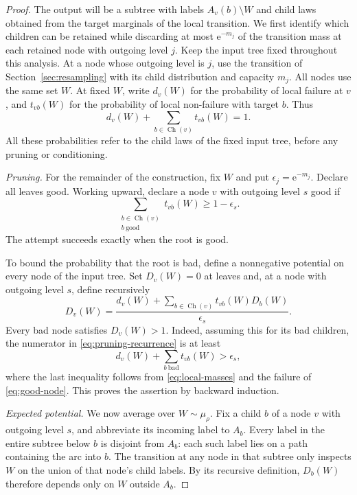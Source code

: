 \documentclass[11pt]{article}
\numberwithin{equation}{section}
\newcommand{\ch}{\operatorname{Ch}}
\newcommand{\ee}{\mathrm e}
\begin{document}
\begin{proof}
The output will be a subtree with labels $A_v(b)\setminus W$ and
child laws obtained from the target marginals of the local transition.
We first identify which children can be retained while discarding
at most $\ee^{-m_j}$ of the transition mass at each retained node
with outgoing level $j$.
Keep the input tree fixed throughout this analysis. At a node whose
outgoing level is $j$, use the transition of
Section~\ref{sec:resampling} with its child distribution and
capacity $m_j$. All nodes use the same set $W$. At fixed $W$, write
$d_v(W)$ for the probability of local failure at $v$, and
$t_{vb}(W)$ for the probability of local non-failure with target $b$.
Thus
\begin{equation}\label{eq:local-masses}
 d_v(W)+\sum_{b\in\ch(v)}t_{vb}(W)=1.
\end{equation}
All these probabilities refer to the child laws of the fixed input
tree, before any pruning or conditioning.

\medskip\noindent
\textit{Pruning.}
For the remainder of the construction, fix $W$ and put
$\epsilon_j=\ee^{-m_j}$. Declare all leaves good. Working upward,
declare a node $v$ with outgoing level $s$ good if
\begin{equation}\label{eq:good-node}
 \sum_{\substack{b\in\ch(v)\\b\ \mathrm{good}}}t_{vb}(W)
 \ge1-\epsilon_s.
\end{equation}
The attempt succeeds exactly when the root is good.

To bound the probability that the root is bad, define a nonnegative
potential on every node of the input tree. Set $D_v(W)=0$ at leaves
and, at a node with outgoing level $s$, define recursively
\begin{equation}\label{eq:pruning-recurrence}
 D_v(W)=\frac{d_v(W)+\sum_{b\in\ch(v)}t_{vb}(W)D_b(W)}{\epsilon_s}.
\end{equation}
Every bad node satisfies $D_v(W)>1$. Indeed, assuming this for its
bad children, the numerator in \eqref{eq:pruning-recurrence} is at
least
\[
 d_v(W)+\sum_{b\ \mathrm{bad}}t_{vb}(W)>\epsilon_s,
\]
where the last inequality follows from \eqref{eq:local-masses} and
the failure of \eqref{eq:good-node}. This proves the assertion by
backward induction.

\medskip\noindent
\textit{Expected potential.}
We now average over $W\sim\mu_\rho$. Fix a child $b$ of a node $v$
with outgoing level $s$, and abbreviate its incoming label to $A_b$.
Every label in the entire subtree below $b$ is disjoint from $A_b$:
each such label lies on a path containing the arc into $b$.
The transition at any node in that subtree only inspects $W$ on the union
of that node's child labels. By its recursive definition, $D_b(W)$
therefore depends only on $W$ outside $A_b$.


\end{proof}
\end{document}
